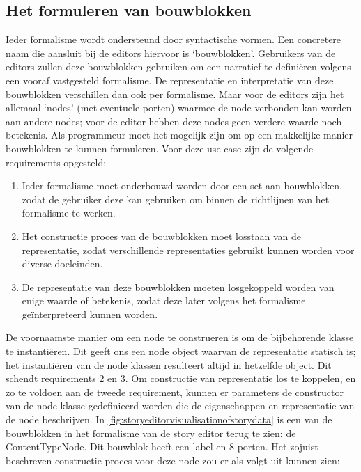 \subsection{Het formuleren van bouwblokken}
\label{subsec:formulerenvanbouwblokken}
Ieder formalisme wordt ondersteund door syntactische vormen. Een concretere naam die aansluit bij de editors hiervoor is ‘bouwblokken’. Gebruikers van de editors zullen deze bouwblokken gebruiken om een narratief te definiëren volgens een vooraf vastgesteld formalisme. De representatie en interpretatie van deze bouwblokken verschillen dan ook per formalisme. Maar voor de editors zijn het allemaal ‘nodes’ (met eventuele porten) waarmee de node verbonden kan worden aan andere nodes; voor de editor hebben deze nodes geen verdere waarde noch betekenis. Als programmeur moet het mogelijk zijn om op een makkelijke manier bouwblokken te kunnen formuleren. Voor deze use case zijn de volgende requirements opgesteld:

\begin{enumerate}
    \item Ieder formalisme moet onderbouwd worden door een set aan bouwblokken, zodat de gebruiker deze kan gebruiken om binnen de richtlijnen van het formalisme te werken.
    \item Het constructie proces van de bouwblokken moet losstaan van de representatie, zodat verschillende representaties gebruikt kunnen worden voor diverse doeleinden.
    \item De representatie van deze bouwblokken moeten losgekoppeld worden van enige waarde of betekenis, zodat deze later volgens het formalisme geïnterpreteerd kunnen worden.
\end{enumerate}

\noindent De voornaamste manier om een node te construeren is om de bijbehorende klasse te instantiëren. Dit geeft ons een node object waarvan de representatie statisch is; het instantiëren van de node klassen resulteert altijd in hetzelfde object. Dit schendt requirements 2 en 3. Om constructie van representatie los te koppelen, en zo te voldoen aan de tweede requirement, kunnen er parameters de constructor van de node klasse gedefinieerd worden die de eigenschappen en representatie van de node beschrijven. In \autoref{fig:storyeditorvisualisationofstorydata} is een van de bouwblokken in het formalisme van de story editor terug te zien: de ContentTypeNode. Dit bouwblok heeft een label en 8 porten. Het zojuist beschreven constructie proces voor deze node zou er als volgt uit kunnen zien:\\


